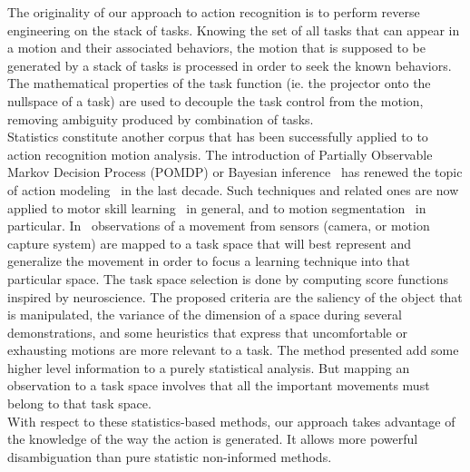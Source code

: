 \documentclass[letterpaper, 10pt, conference]{ieeeconf}      %
\begin{document}
The originality of our approach to action recognition is to perform
reverse engineering on the stack of tasks. Knowing the set of
all tasks that can appear in a motion and their associated behaviors, 
the motion that is supposed to be generated by a stack of tasks is processed in order to
seek the known behaviors. The mathematical properties of the task function (ie. the projector onto
the nullspace of a task) are used to decouple the task control from the motion, removing
ambiguity produced by combination of tasks.\\

Statistics constitute another corpus that has been successfully applied
to to action recognition motion analysis. The introduction of Partially
Observable Markov Decision Process (POMDP) or Bayesian inference~\cite{pearl88} has
renewed the topic of action modeling~\cite{kaelbling98} in the last decade. Such
techniques and related ones are now applied to motor skill learning~\cite{peters08} in
general, and to motion segmentation~\cite{calinon10, inamura04} in particular. 
In~\cite{muhlig09} observations of a movement from sensors (camera, or motion capture system)
are mapped to a task space that will best represent and generalize the movement in order to focus
a learning technique into that particular space. The task space selection is
done by computing score functions inspired by neuroscience. The proposed criteria are
the saliency of the object that is manipulated, the variance of the dimension
of a space during several demonstrations, and some heuristics that express that
uncomfortable or exhausting motions are more relevant to a task. The method
presented add some higher level information to a purely statistical analysis. But
mapping an observation to a task space involves that all the important movements must
belong to that task space.\\

With respect to these statistics-based methods, our approach takes advantage of the
knowledge of the way the action is generated. It allows more powerful
disambiguation than pure statistic non-informed methods.
\end{document}
